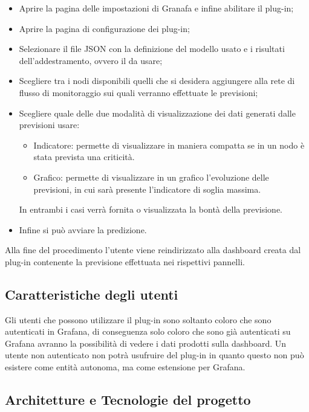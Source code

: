 \documentclass[../analisi-dei-requisiti.tex]{subfiles}
\begin{document}
	\begin{itemize}
			\item{Aprire la pagina delle impostazioni di Granafa e infine abilitare il plug-in;}
			\item{Aprire la pagina di configurazione dei plug-in;}
			\item{Selezionare il file JSON con la definizione del modello usato e i risultati dell'addestramento, ovvero il  da usare;}
			\item{Scegliere tra i nodi disponibili quelli che si desidera aggiungere alla rete di flusso di monitoraggio sui quali verranno effettuate le previsioni;}
			\item{Scegliere quale delle due modalità di visualizzazione dei dati generati dalle previsioni usare:}
			\begin{itemize}
				\item{Indicatore: permette di visualizzare in maniera compatta se in un nodo è stata prevista una criticità.}
				\item{Grafico: permette di visualizzare in un grafico l'evoluzione delle previsioni, in cui sarà presente l'indicatore di soglia massima.}
			\end{itemize}
			In entrambi i casi verrà fornita o visualizzata la bontà della previsione.
			\item{Infine si può avviare la predizione.}
	\end{itemize}
	Alla fine del procedimento l'utente viene reindirizzato alla dashboard creata dal plug-in contenente la previsione effettuata nei rispettivi pannelli.

\subsection{Caratteristiche degli utenti}
\label{caratteristiche_degli_utenti} 
	Gli utenti che possono utilizzare il plug-in sono soltanto coloro che sono autenticati in Grafana, di conseguenza solo coloro che sono già autenticati su Grafana avranno la possibilità di vedere i dati prodotti sulla dashboard. Un utente non autenticato non potrà usufruire del plug-in in quanto questo non può esistere come entità autonoma, ma come estensione per Grafana.

\subsection{Architetture e Tecnologie del progetto}
\label{subs:architetture_e_tecnologie_del_progetto}
\end{document}
